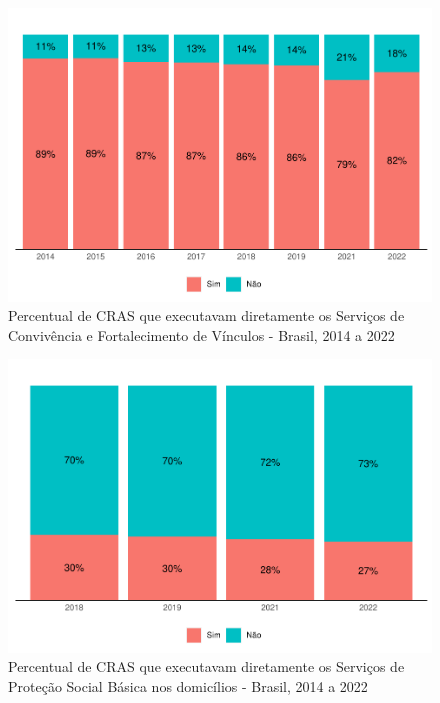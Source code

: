 \documentclass[
  brazilian]{report}
\begin{document}
\begin{figure}
\includegraphics{Censo-SUAS-2022_files/figure-latex/CRAS-SCFV-1} \caption[Percentual de CRAS que executavam diretamente os Serviços de Convivência e Fortalecimento de Vínculos - Brasil, 2014 a 2022]{Percentual de CRAS que executavam diretamente os Serviços de Convivência e Fortalecimento de Vínculos - Brasil, 2014 a 2022}\label{fig:CRAS-SCFV}
\end{figure}

\begin{figure}
\includegraphics{Censo-SUAS-2022_files/figure-latex/CRAS-PSB-1} \caption[Percentual de CRAS que executavam diretamente os Serviços de Proteção Social Básica nos domicílios - Brasil, 2014 a 2022]{Percentual de CRAS que executavam diretamente os Serviços de Proteção Social Básica nos domicílios - Brasil, 2014 a 2022}\label{fig:CRAS-PSB}
\end{figure}
\end{document}
